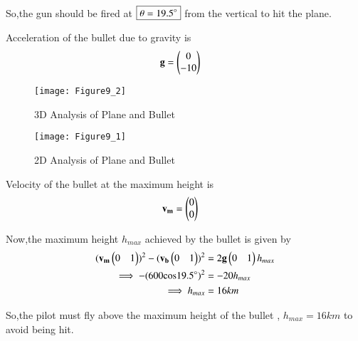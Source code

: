 \documentclass[journal,12pt,twocolumn]{IEEEtran}
\begin{document}
So,the gun should be fired at $\boxed{\theta=19.5\degree}$ from the vertical to hit the plane.

Acceleration of the bullet due to gravity is
\begin{align}
    \mathbf{g} &= \begin{pmatrix}0 \\ -10\end{pmatrix}
\end{align}

\begin{figure}[!ht]
\centering
\texttt{[image: Figure9\_2]}
\caption{3D Analysis of Plane and Bullet}
\label{fig:3D}	
\end{figure}

\begin{figure}[!ht]
\centering
\texttt{[image: Figure9\_1]}
\caption{2D Analysis of Plane and Bullet}
\label{fig:2D}	
\end{figure}

Velocity of the bullet at the maximum height is
\begin{align}
    \mathbf{v_m} &= \begin{pmatrix}0 \\ 0\end{pmatrix}
\end{align}

Now,the maximum height $h_{max}$ achieved by the bullet is given by
\begin{align}
    (\mathbf{v_m}\begin{pmatrix}0 & 1\end{pmatrix})^2- (\mathbf{v_b}\begin{pmatrix}0 & 1\end{pmatrix})^2 &= 2\mathbf{g}\begin{pmatrix}0 & 1\end{pmatrix}h_{max} 
    \\
    \implies -(600\text{cos}19.5\degree)^2 &= -20h_{max}
    \\
    \implies h_{max} &= 16 km
\end{align}

So,the pilot must fly above the maximum height of the bullet , $\boxed{h_{max} = 16 km}$ to avoid being hit.
\end{document}
